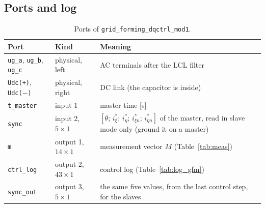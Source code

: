 \documentclass[11pt,a4paper]{scrartcl}
\newcommand{\code}[1]{\texttt{#1}}
\begin{document}
\begin{onehalfspace}
\subsection{Ports and log}
\label{sec:gfm_ports}

\begin{table}[H]
	\centering
	\captionsetup{width=0.9\textwidth, font=small}
	\caption[Ports of the grid-forming block.]{Ports of \code{grid\_forming\_dqctrl\_mod1}.}
	\label{tab:ports_gfm}
	\begin{tabularx}{0.95\textwidth}{@{} l l X @{}}
		\toprule
		\textbf{Port} & \textbf{Kind} & \textbf{Meaning} \\
		\midrule
		\code{ug\_a}, \code{ug\_b}, \code{ug\_c} & physical, left & AC terminals after the LCL filter \\
		\code{Udc(+)}, \code{Udc($-$)} & physical, right & DC link (the capacitor is inside) \\
		\code{t\_master} & input 1 & master time [\si{\second}] \\
		\code{sync} & input 2, $5 \times 1$ & $[\theta;\, i^{*}_\xi;\, i^{*}_\eta;\, i^{*}_{\xi n};\, i^{*}_{\eta n}]$ of the master, read in slave mode only (ground it on a master) \\
		\code{m} & output 1, $14 \times 1$ & measurement vector $M$ (Table~\ref{tab:meas}) \\
		\code{ctrl\_log} & output 2, $43 \times 1$ & control log (Table~\ref{tab:log_gfm}) \\
		\code{sync\_out} & output 3, $5 \times 1$ & the same five values, from the last control step, for the slaves \\
		\bottomrule
	\end{tabularx}
\end{table}


\end{onehalfspace}
\end{document}

